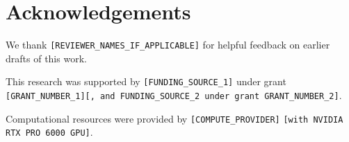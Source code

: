 \section*{Acknowledgements}

We thank \texttt{[REVIEWER\_NAMES\_IF\_APPLICABLE]} for helpful feedback on earlier drafts of this work.

This research was supported by \texttt{[FUNDING\_SOURCE\_1]} under grant \texttt{[GRANT\_NUMBER\_1]}\texttt{[, and FUNDING\_SOURCE\_2 under grant GRANT\_NUMBER\_2]}.

Computational resources were provided by \texttt{[COMPUTE\_PROVIDER]} \texttt{[with NVIDIA RTX PRO 6000 GPU]}.

